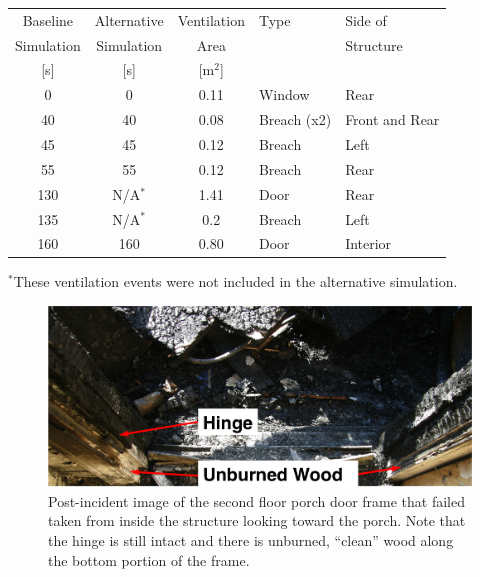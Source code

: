 \documentclass[12pt,oneside]{book}
\begin{document}
\begin{table}
\centering
{}\label{tab:vents}
\begin{tabular}{cccll}
\toprule[1.5pt]
Baseline    &  Alternative  &  Ventilation  &  Type         &  Side of         \\
Simulation  &  Simulation   &  Area         &               &  Structure       \\
{[s]}       &  {[s]}        &  [m$^2$]      &               &                  \\
\midrule
0           &  0            &  0.11         &  Window       &  Rear            \\
40          &  40           &  0.08         &  Breach (x2)  &  Front and Rear  \\
45          &  45           &  0.12         &  Breach       &  Left            \\
55          &  55           &  0.12         &  Breach       &  Rear            \\
130         &  N/A$^*$      &  1.41         &  Door         &  Rear            \\
135         &  N/A$^*$      &  0.2          &  Breach       &  Left            \\
160         &  160          &  0.80         &  Door         &  Interior        \\
\bottomrule[1.25pt]
\end{tabular}\par
\footnotesize
$^*$These ventilation events were not included in the alternative simulation.
\normalsize
\end{table}

\begin{figure}[!ht]
\centering
\includegraphics[width=.80\textwidth]{../Figures/door_frame_burn}
\caption[Post-incident image of rear porch door frame.]{Post-incident image of the second floor porch door frame that failed taken from inside the structure looking toward the porch. Note that the hinge is still intact and there is unburned, ``clean'' wood along the bottom portion of the frame.}
\label{fig:door_frame}
\end{figure}
\end{document}
